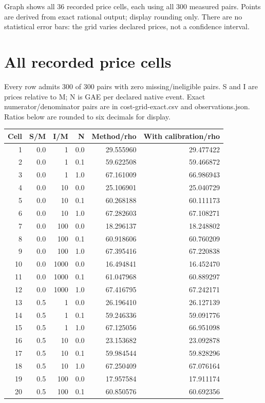 \documentclass[10pt]{article}
\begin{document}
\noindent Graph shows all 36 recorded price cells, each using all 300 measured pairs. Points are derived from exact rational output; display rounding only. There are no statistical error bars: the grid varies declared prices, not a confidence interval.
\newpage\section*{All recorded price cells}
\noindent Every row admits 300 of 300 pairs with zero missing/ineligible pairs. S and I are prices relative to M; N is GAE per declared native event. Exact numerator/denominator pairs are in cost-grid-exact.csv and observations.json. Ratios below are rounded to six decimals for display.
\begin{longtable}{rrrrrr}\toprule Cell&S/M&I/M&N&Method/rho&With calibration/rho\\\midrule\endhead
1 & 0.0 & 1 & 0.0 & 29.555960 & 29.477422 \\
2 & 0.0 & 1 & 0.1 & 59.622508 & 59.466872 \\
3 & 0.0 & 1 & 1.0 & 67.161009 & 66.986943 \\
4 & 0.0 & 10 & 0.0 & 25.106901 & 25.040729 \\
5 & 0.0 & 10 & 0.1 & 60.268188 & 60.111173 \\
6 & 0.0 & 10 & 1.0 & 67.282603 & 67.108271 \\
7 & 0.0 & 100 & 0.0 & 18.296137 & 18.248802 \\
8 & 0.0 & 100 & 0.1 & 60.918606 & 60.760209 \\
9 & 0.0 & 100 & 1.0 & 67.395416 & 67.220838 \\
10 & 0.0 & 1000 & 0.0 & 16.494841 & 16.452470 \\
11 & 0.0 & 1000 & 0.1 & 61.047968 & 60.889297 \\
12 & 0.0 & 1000 & 1.0 & 67.416795 & 67.242171 \\
13 & 0.5 & 1 & 0.0 & 26.196410 & 26.127139 \\
14 & 0.5 & 1 & 0.1 & 59.246336 & 59.091776 \\
15 & 0.5 & 1 & 1.0 & 67.125056 & 66.951098 \\
16 & 0.5 & 10 & 0.0 & 23.153682 & 23.092878 \\
17 & 0.5 & 10 & 0.1 & 59.984544 & 59.828296 \\
18 & 0.5 & 10 & 1.0 & 67.250409 & 67.076164 \\
19 & 0.5 & 100 & 0.0 & 17.957584 & 17.911174 \\
20 & 0.5 & 100 & 0.1 & 60.850576 & 60.692356 \\

\end{longtable}
\end{document}
